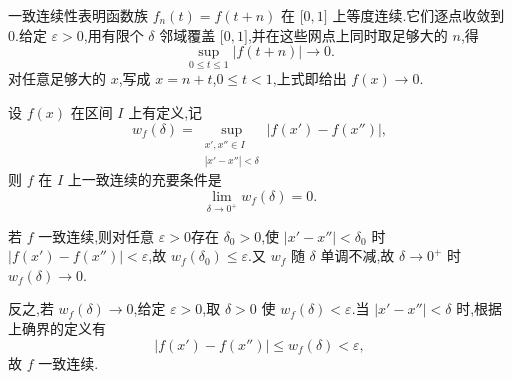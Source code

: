 \begin{solution}
    一致连续性表明函数族 $f_n(t)=f(t+n)$ 在 $\lbrack0,1\rbrack$ 上等度连续.它们逐点收敛到 $0$.给定 $\varepsilon>0$,用有限个 $\delta$ 邻域覆盖 $\lbrack0,1\rbrack$,并在这些网点上同时取足够大的 $n$,得
    \[
        \sup\limits_{0\leq t\leq1}|f(t+n)|\longrightarrow0.
    \]
    对任意足够大的 $x$,写成 $x=n+t$,$0\leq t<1$,上式即给出 $f(x)\to0$.
\end{solution}

\begin{example}
    设 $f(x)$ 在区间 $I$ 上有定义,记
    \[
        w_f(\delta)
        =\sup\limits_{\substack{x',x''\in I\\|x'-x''|<\delta}}
        |f(x')-f(x'')|,
    \]
    则 $f$ 在 $I$ 上一致连续的充要条件是
    \[
        \lim\limits_{\delta\to0^+}w_f(\delta)=0.
    \]
\end{example}
\exampleblank

\begin{solution}
    若 $f$ 一致连续,则对任意 $\varepsilon>0$存在 $\delta_0>0$,使 $|x'-x''|<\delta_0$ 时 $|f(x')-f(x'')|<\varepsilon$,故 $w_f(\delta_0)\leq\varepsilon$.又 $w_f$ 随 $\delta$ 单调不减,故 $\delta\to0^+$ 时 $w_f(\delta)\to0$.

    反之,若 $w_f(\delta)\to0$,给定 $\varepsilon>0$,取 $\delta>0$ 使 $w_f(\delta)<\varepsilon$.当 $|x'-x''|<\delta$ 时,根据上确界的定义有
    \[
        |f(x')-f(x'')|\leq w_f(\delta)<\varepsilon,
    \]
    故 $f$ 一致连续.
\end{solution}
